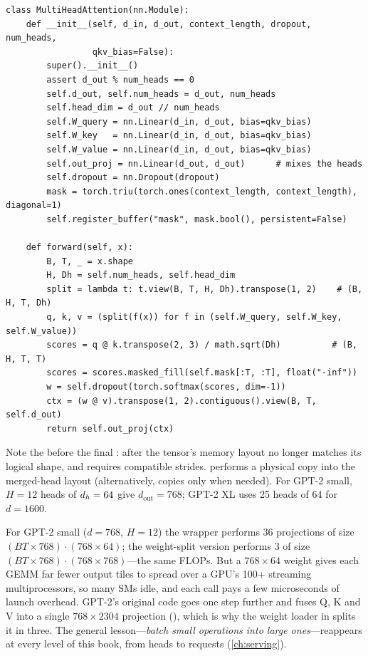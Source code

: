 \begin{lstlisting}[caption={Multi-head attention with weight splits (Lab 4, Part D; same parameter names as \texttt{llmsys.layers.MultiHeadAttention}).},label={lst:attention:mha}]
class MultiHeadAttention(nn.Module):
    def __init__(self, d_in, d_out, context_length, dropout, num_heads,
                 qkv_bias=False):
        super().__init__()
        assert d_out % num_heads == 0
        self.d_out, self.num_heads = d_out, num_heads
        self.head_dim = d_out // num_heads
        self.W_query = nn.Linear(d_in, d_out, bias=qkv_bias)
        self.W_key   = nn.Linear(d_in, d_out, bias=qkv_bias)
        self.W_value = nn.Linear(d_in, d_out, bias=qkv_bias)
        self.out_proj = nn.Linear(d_out, d_out)      # mixes the heads
        self.dropout = nn.Dropout(dropout)
        mask = torch.triu(torch.ones(context_length, context_length), diagonal=1)
        self.register_buffer("mask", mask.bool(), persistent=False)

    def forward(self, x):
        B, T, _ = x.shape
        H, Dh = self.num_heads, self.head_dim
        split = lambda t: t.view(B, T, H, Dh).transpose(1, 2)    # (B, H, T, Dh)
        q, k, v = (split(f(x)) for f in (self.W_query, self.W_key, self.W_value))
        scores = q @ k.transpose(2, 3) / math.sqrt(Dh)          # (B, H, T, T)
        scores = scores.masked_fill(self.mask[:T, :T], float("-inf"))
        w = self.dropout(torch.softmax(scores, dim=-1))
        ctx = (w @ v).transpose(1, 2).contiguous().view(B, T, self.d_out)
        return self.out_proj(ctx)
\end{lstlisting}

Note the  before the final : after  the tensor's
memory layout no longer matches its logical shape, and  requires compatible strides.
 performs a physical copy into the merged-head layout (alternatively,
 copies only when needed). For GPT-2 small, $H=12$ heads of $d_{h}=64$ give
$d_{\text{out}}=768$; GPT-2 XL uses 25 heads of 64 for $d=1600$.

\begin{systemslens}
For GPT-2 small ($d=768$, $H=12$) the wrapper performs 36 projections of size
$(BT\times768)\cdot(768\times64)$; the weight-split version performs 3 of size
$(BT\times768)\cdot(768\times768)$---the same FLOPs. But a $768\times64$ weight gives each GEMM far
fewer output tiles to spread over a GPU's 100+ streaming multiprocessors, so many SMs idle, and each
call pays a few microseconds of launch overhead. GPT-2's original code goes one step further and
fuses Q, K and V into a single $768\times2304$ projection (), which is why the weight
loader in  splits it in three. The general lesson---\emph{batch small
operations into large ones}---reappears at every level of this book, from heads to requests
(\cref{ch:serving}).
\end{systemslens}

